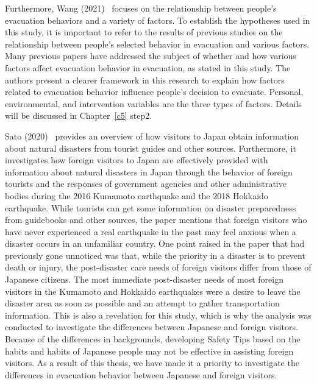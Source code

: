 Furthermore, Wang (2021)~\cite{ref9} focuses on the relationship between people's evacuation behaviors and a variety of factors. To establish the hypotheses used in this study, it is important to refer to the results of previous studies on the relationship between people's selected behavior in evacuation and various factors. Many previous papers have addressed the subject of whether and how various factors affect evacuation behavior in evacuation, as stated in this study. The authors present a clearer framework in this research to explain how factors related to evacuation behavior influence people's decision to evacuate. Personal, environmental, and intervention variables are the three types of factors. Details will be discussed in Chapter~\ref{c5} step2. 

Sato (2020)~\cite{ref8} provides an overview of how visitors to Japan obtain information about natural disasters from tourist guides and other sources. Furthermore, it investigates how foreign visitors to Japan are effectively provided with information about natural disasters in Japan through the behavior of foreign tourists and the responses of government agencies and other administrative bodies during the 2016 Kumamoto earthquake and the 2018 Hokkaido earthquake. While tourists can get some information on disaster preparedness from guidebooks and other sources, the paper mentions that foreign visitors who have never experienced a real earthquake in the past may feel anxious when a disaster occurs in an unfamiliar country. One point raised in the paper that had previously gone unnoticed was that, while the priority in a disaster is to prevent death or injury, the post-disaster care needs of foreign visitors differ from those of Japanese citizens. The most immediate post-disaster needs of most foreign visitors in the Kumamoto and Hokkaido earthquakes were a desire to leave the disaster area as soon as possible and an attempt to gather transportation information. This is also a revelation for this study, which is why the analysis was conducted to investigate the differences between Japanese and foreign visitors. Because of the differences in backgrounds, developing Safety Tips based on the habits and habits of Japanese people may not be effective in assisting foreign visitors. As a result of this thesis, we have made it a priority to investigate the differences in evacuation behavior between Japanese and foreign visitors.

